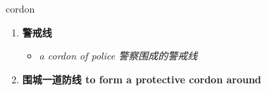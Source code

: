 
\begin{frame}
{\huge cordon}
\begin{center}
\begin{enumerate}\Large
  \item \textbf{警戒线}
  \begin{itemize}
    \item \em{\Large{a cordon of police 警察围成的警戒线}}
  \end{itemize}
  \item \textbf{围城一道防线 to form a protective cordon around}
\end{enumerate}
\end{center}
\end{frame}
